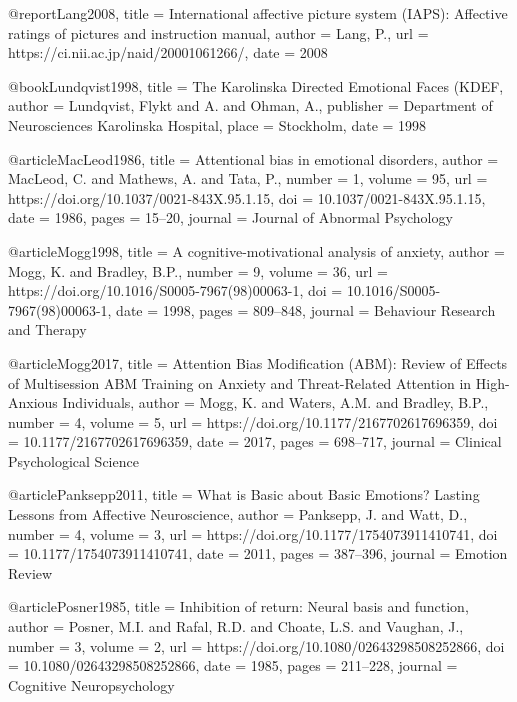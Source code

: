 @report{Lang2008,
    title       = {International affective picture system (IAPS): Affective ratings of pictures and instruction manual},
    author      = {Lang, P.},
    url         = {https://ci.nii.ac.jp/naid/20001061266/},
    date        = {2008}
}


@book{Lundqvist1998,
    title       = {The Karolinska Directed Emotional Faces (KDEF},
    author      = {Lundqvist, Flykt and A. and Ohman, A.},
    publisher   = {Department of Neurosciences Karolinska Hospital},
    place       = {Stockholm},
    date        = {1998}
}


@article{MacLeod1986,
    title       = {Attentional bias in emotional disorders},
    author      = {MacLeod, C. and Mathews, A. and Tata, P.},
    number      = {1},
    volume      = {95},
    url         = {https://doi.org/10.1037/0021-843X.95.1.15},
    doi         = {10.1037/0021-843X.95.1.15},
    date        = {1986},
    pages       = {15–20},
    journal     = {Journal of Abnormal Psychology}
}


@article{Mogg1998,
    title       = {A cognitive-motivational analysis of anxiety},
    author      = {Mogg, K. and Bradley, B.P.},
    number      = {9},
    volume      = {36},
    url         = {https://doi.org/10.1016/S0005-7967(98)00063-1},
    doi         = {10.1016/S0005-7967(98)00063-1},
    date        = {1998},
    pages       = {809–848},
    journal     = {Behaviour Research and Therapy}
}


@article{Mogg2017,
    title       = {Attention Bias Modification (ABM): Review of Effects of Multisession ABM Training on Anxiety and Threat-Related Attention in High-Anxious Individuals},
    author      = {Mogg, K. and Waters, A.M. and Bradley, B.P.},
    number      = {4},
    volume      = {5},
    url         = {https://doi.org/10.1177/2167702617696359},
    doi         = {10.1177/2167702617696359},
    date        = {2017},
    pages       = {698–717},
    journal     = {Clinical Psychological Science}
}


@article{Panksepp2011,
    title       = {What is Basic about Basic Emotions? Lasting Lessons from Affective Neuroscience},
    author      = {Panksepp, J. and Watt, D.},
    number      = {4},
    volume      = {3},
    url         = {https://doi.org/10.1177/1754073911410741},
    doi         = {10.1177/1754073911410741},
    date        = {2011},
    pages       = {387–396},
    journal     = {Emotion Review}
}


@article{Posner1985,
    title       = {Inhibition of return: Neural basis and function},
    author      = {Posner, M.I. and Rafal, R.D. and Choate, L.S. and Vaughan, J.},
    number      = {3},
    volume      = {2},
    url         = {https://doi.org/10.1080/02643298508252866},
    doi         = {10.1080/02643298508252866},
    date        = {1985},
    pages       = {211–228},
    journal     = {Cognitive Neuropsychology}
}


